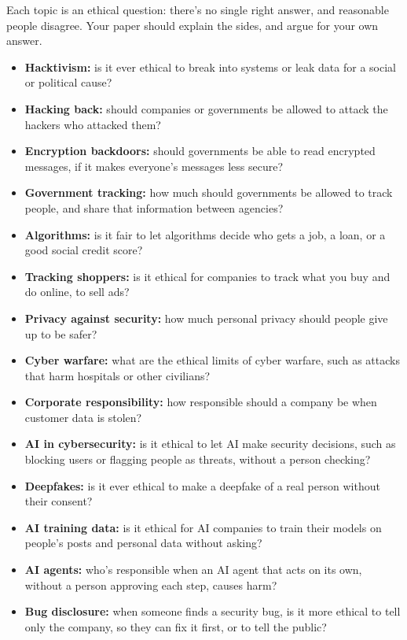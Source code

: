 \documentclass[12pt]{article}
\begin{document}
Each topic is an ethical question: there's no single right answer, and reasonable people disagree. Your paper should explain the sides, and argue for your own answer.
\begin{itemize}
    \item \textbf{Hacktivism:} is it ever ethical to break into systems or leak data for a social or political cause?
    \item \textbf{Hacking back:} should companies or governments be allowed to attack the hackers who attacked them?
    \item \textbf{Encryption backdoors:} should governments be able to read encrypted messages, if it makes everyone's messages less secure?
    \item \textbf{Government tracking:} how much should governments be allowed to track people, and share that information between agencies?
    \item \textbf{Algorithms:} is it fair to let algorithms decide who gets a job, a loan, or a good social credit score?
    \item \textbf{Tracking shoppers:} is it ethical for companies to track what you buy and do online, to sell ads?
    \item \textbf{Privacy against security:} how much personal privacy should people give up to be safer?
    \item \textbf{Cyber warfare:} what are the ethical limits of cyber warfare, such as attacks that harm hospitals or other civilians?
    \item \textbf{Corporate responsibility:} how responsible should a company be when customer data is stolen?
    \item \textbf{AI in cybersecurity:} is it ethical to let AI make security decisions, such as blocking users or flagging people as threats, without a person checking?
    \item \textbf{Deepfakes:} is it ever ethical to make a deepfake of a real person without their consent?
    \item \textbf{AI training data:} is it ethical for AI companies to train their models on people's posts and personal data without asking?
    \item \textbf{AI agents:} who's responsible when an AI agent that acts on its own, without a person approving each step, causes harm?
    \item \textbf{Bug disclosure:} when someone finds a security bug, is it more ethical to tell only the company, so they can fix it first, or to tell the public?

\end{itemize}
\end{document}
